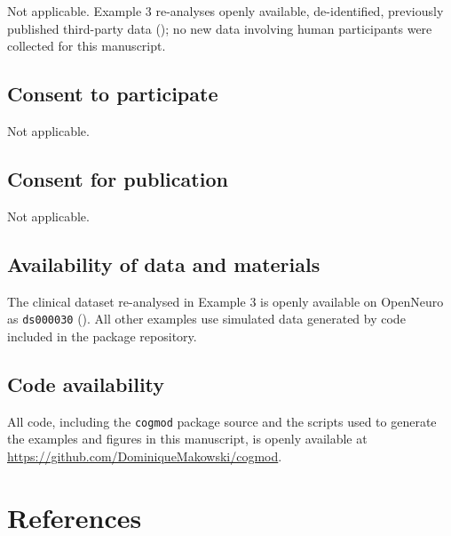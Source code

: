 \documentclass[
  jou,
  floatsintext,
  longtable,
  nolmodern,
  notxfonts,
  notimes,
  12pt,
  colorlinks=true,linkcolor=blue,citecolor=blue,urlcolor=blue]{apa7}
\begin{document}
Not applicable. Example 3 re-analyses openly available, de-identified,
previously published third-party data
(); no new data
involving human participants were collected for this manuscript.

\subsection{Consent to participate}\label{consent-to-participate}

Not applicable.

\subsection{Consent for publication}\label{consent-for-publication}

Not applicable.

\subsection{Availability of data and
materials}\label{availability-of-data-and-materials}

The clinical dataset re-analysed in Example 3 is openly available on
OpenNeuro as \texttt{ds000030}
(). All other
examples use simulated data generated by code included in the package
repository.

\subsection{Code availability}\label{code-availability}

All code, including the \texttt{cogmod} package source and the scripts
used to generate the examples and figures in this manuscript, is openly
available at \url{https://github.com/DominiqueMakowski/cogmod}.

\section{References}\label{references}
\end{document}
